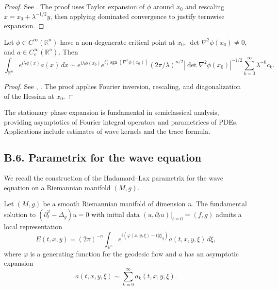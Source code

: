 \begin{proof}
See \cite[Chapter~7]{HormanderI}. The proof uses Taylor expansion of $\phi$ around $x_0$ and rescaling $x = x_0 + \lambda^{-1/2} y$, then applying dominated convergence to justify termwise expansion.
\end{proof}

\begin{theorem}
\label{thm:stationary-multi}
Let $\phi \in C^\infty(\mathbb{R}^n)$ have a non-degenerate critical point at $x_0$, $\det \nabla^2 \phi(x_0) \neq 0$, and $a \in C_c^\infty(\mathbb{R}^n)$. Then
\[
\int_{\mathbb{R}^n} e^{i \lambda \phi(x)} a(x)\, dx \sim e^{i \lambda \phi(x_0)} e^{i \frac{\pi}{4} \operatorname{sgn}(\nabla^2 \phi(x_0))} (2\pi/\lambda)^{n/2} |\det \nabla^2 \phi(x_0)|^{-1/2} \sum_{k=0}^\infty \lambda^{-k} c_k.
\]
\end{theorem}

\begin{proof}
See \cite[Chapter~7]{HormanderI}, \cite[Appendix~A]{Zworski}. The proof applies Fourier inversion, rescaling, and diagonalization of the Hessian at $x_0$.
\end{proof}

\begin{remark}
The stationary phase expansion is fundamental in semiclassical analysis, providing asymptotics of Fourier integral operators and parametrices of PDEs. Applications include estimates of wave kernels and the trace formula.
\end{remark}

\medskip

\subsection*{B.6. Parametrix for the wave equation}
\label{appB:parametrix}

We recall the construction of the Hadamard–Lax parametrix for the wave equation on a Riemannian manifold $(M,g)$.

\begin{theorem}
\label{thm:wave-parametrix}
Let $(M,g)$ be a smooth Riemannian manifold of dimension $n$. The fundamental solution to $(\partial_t^2 - \Delta_g)u=0$ with initial data $(u,\partial_t u)|_{t=0}=(f,g)$ admits a local representation
\[
E(t,x,y) = (2\pi)^{-n} \int_{\mathbb{R}^n} e^{i (\varphi(x,y,\xi) - t|\xi|_g)} a(t,x,y,\xi)\, d\xi,
\]
where $\varphi$ is a generating function for the geodesic flow and $a$ has an asymptotic expansion
\[
a(t,x,y,\xi) \sim \sum_{k=0}^\infty a_k(t,x,y,\xi).
\]
\end{theorem}

